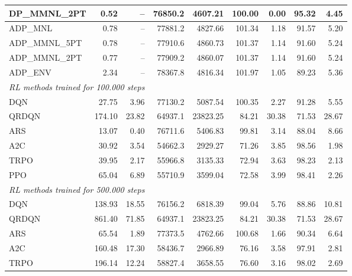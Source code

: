 \begin{samepage}
\begin{center}
\begin{tabular}{l|rr|rr|rr|rr}
    DP\_MMNL\_2PT &     0.52 &    -- &    76850.2 &    4607.21 &  100.00 &    0.00 &   95.32 &    4.45 \\
    \midrule
    ADP\_MNL     &     0.78 &    -- &    77881.2 &    4827.66 &  101.34 &    1.18 &   91.57 &    5.20 \\
    ADP\_MMNL\_5PT &     0.78 &    -- &    77910.6 &    4860.73 &  101.37 &    1.14 &   91.60 &    5.24 \\
    ADP\_MMNL\_2PT &     0.77 &    -- &    77909.2 &    4860.07 &  101.37 &    1.14 &   91.60 &    5.24 \\
    ADP\_ENV     &     2.34 &    -- &    78367.8 &    4816.34 &  101.97 &    1.05 &   89.23 &    5.36 \\
    \midrule
    \multicolumn{9}{l}{\textit{RL methods trained for 100.000 steps}} \\
    \midrule
    DQN          &    27.75 &     3.96 &    77130.2 &    5087.54 &  100.35 &    2.27 &   91.28 &    5.55 \\
    QRDQN        &   174.10 &    23.82 &    64937.1 &   23823.25 &   84.21 &   30.38 &   71.53 &   28.67 \\
    ARS          &    13.07 &     0.40 &    76711.6 &    5406.83 &   99.81 &    3.14 &   88.04 &    8.66 \\
    A2C          &    30.92 &     3.54 &    54662.3 &    2929.27 &   71.26 &    3.85 &   98.56 &    1.98 \\
    TRPO         &    39.95 &     2.17 &    55966.8 &    3135.33 &   72.94 &    3.63 &   98.23 &    2.13 \\
    PPO          &    65.04 &     6.89 &    55710.9 &    3599.04 &   72.58 &    3.99 &   98.41 &    2.26 \\
    \midrule
    \multicolumn{9}{l}{\textit{RL methods trained for 500.000 steps}} \\
    \midrule
    DQN          &   138.93 &    18.55 &    76156.2 &    6818.39 &   99.04 &    5.76 &   88.86 &   10.81 \\
    QRDQN        &   861.40 &    71.85 &    64937.1 &   23823.25 &   84.21 &   30.38 &   71.53 &   28.67 \\
    ARS          &    65.54 &     1.89 &    77373.5 &    4762.66 &  100.68 &    1.66 &   90.34 &    6.64 \\
    A2C          &   160.48 &    17.30 &    58436.7 &    2966.89 &   76.16 &    3.58 &   97.91 &    2.81 \\
    TRPO         &   196.14 &    12.24 &    58827.4 &    3658.55 &   76.60 &    3.16 &   98.02 &    2.69 \\

\end{tabular}
\end{center}
\end{samepage}
